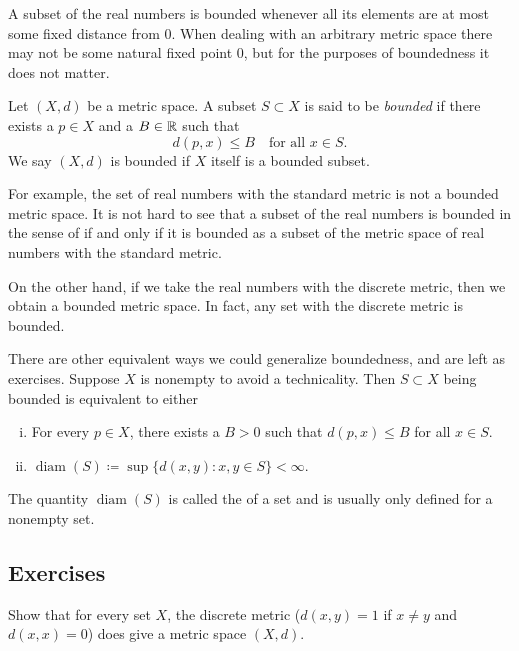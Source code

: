 \medskip

A subset of the real
numbers is bounded whenever all its elements are at most some fixed distance
from 0.
When dealing with an arbitrary metric space there may not be some
natural fixed point 0, but for the purposes of boundedness it does not matter.

\begin{defn}
Let $(X,d)$ be a metric space.  A subset $S \subset X$ is said to be
\emph{bounded} if there exists a $p \in X$ and a
$B \in {\mathbb{R}}$ such that
\begin{equation*}
d(p,x) \leq B \quad \text{for all } x \in S.
\end{equation*}
We say $(X,d)$ is bounded if $X$ itself is a bounded subset.
\end{defn}

For example, the set of real numbers with the standard metric is not a
bounded metric space.  It is not hard to see that a
subset of the real numbers is bounded in the
sense of  if and only if it is bounded as a subset of the
metric space of real numbers with the standard metric.

On the other hand, if we take the real numbers with the discrete metric,
then we obtain a bounded metric space.  In fact, any set with the
discrete metric is bounded.

There are other equivalent ways we could generalize boundedness,
and are left as exercises.  Suppose $X$ is nonempty to avoid a technicality.
Then $S \subset X$ being bounded is equivalent to either
\begin{enumerate}[(i)]
\item
For every $p \in X$, there exists a $B > 0$ such that $d(p,x) \leq B$ for
all $x \in S$.
\item
{}%
$\operatorname{diam}(S) \coloneqq \sup \bigl\{ d(x,y) : x,y \in S \bigr\} < \infty$.
\end{enumerate}
The quantity $\operatorname{diam}(S)$ is called the
\emph{} of a set and is usually only defined for
a nonempty set.

\subsection{Exercises}

\begin{exercise}
Show that for every set $X$, the discrete metric ($d(x,y) = 1$ if $x\not=y$ and
$d(x,x) = 0$) does give a metric space $(X,d)$.
\end{exercise}

